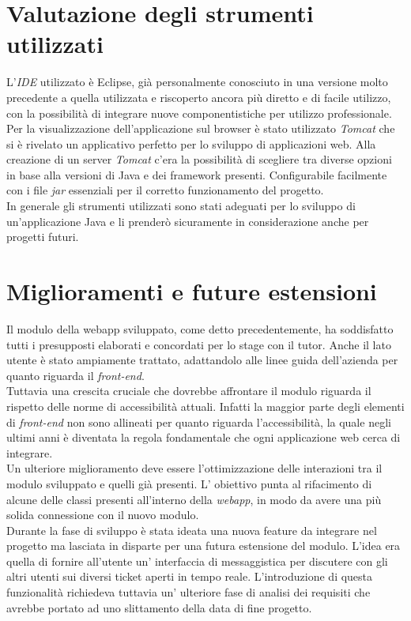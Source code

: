 \section{Valutazione degli strumenti utilizzati}
L'\textit{IDE} utilizzato è Eclipse, già personalmente conosciuto in una versione molto precedente a quella utilizzata e riscoperto ancora più diretto e di facile utilizzo, con la possibilità di integrare nuove componentistiche per utilizzo professionale.\\
Per la visualizzazione dell'applicazione sul browser è stato utilizzato \textit{Tomcat} che si è rivelato un applicativo perfetto per lo sviluppo di applicazioni web. Alla creazione di un server \textit{Tomcat} c'era la possibilità di scegliere tra diverse opzioni in base alla versioni di Java e dei framework presenti. Configurabile facilmente con i file \textit{jar} essenziali per il corretto funzionamento del progetto.\\
In generale gli strumenti utilizzati sono stati adeguati per lo sviluppo di un'applicazione Java e li prenderò sicuramente in considerazione anche per progetti futuri.
 
\section{Miglioramenti e future estensioni}
Il modulo della webapp sviluppato, come detto precedentemente, ha soddisfatto tutti i presupposti elaborati e concordati per lo stage con il tutor. Anche il lato utente è stato ampiamente trattato, adattandolo alle linee guida dell'azienda per quanto riguarda il \textit{front-end}.\\
Tuttavia una crescita cruciale che dovrebbe affrontare il modulo riguarda il rispetto delle norme di accessibilità attuali. Infatti la maggior parte degli elementi di \textit{front-end} non sono allineati per quanto riguarda l'accessibilità, la quale negli ultimi anni è diventata la regola fondamentale che ogni applicazione web cerca di integrare.\\
Un ulteriore miglioramento deve essere l'ottimizzazione delle interazioni tra il modulo sviluppato e quelli già presenti. L' obiettivo punta al rifacimento di alcune delle classi presenti all'interno della \textit{webapp}, in modo da avere una più solida connessione con il nuovo modulo. \\
Durante la fase di sviluppo è stata ideata una nuova feature da integrare nel progetto ma lasciata in disparte per una futura estensione del modulo. L'idea era quella di fornire all'utente un' interfaccia di messaggistica per discutere con gli altri utenti sui diversi ticket aperti in tempo reale. L'introduzione di questa funzionalità richiedeva tuttavia un' ulteriore fase di analisi dei requisiti che avrebbe portato ad uno slittamento della data di fine progetto. 